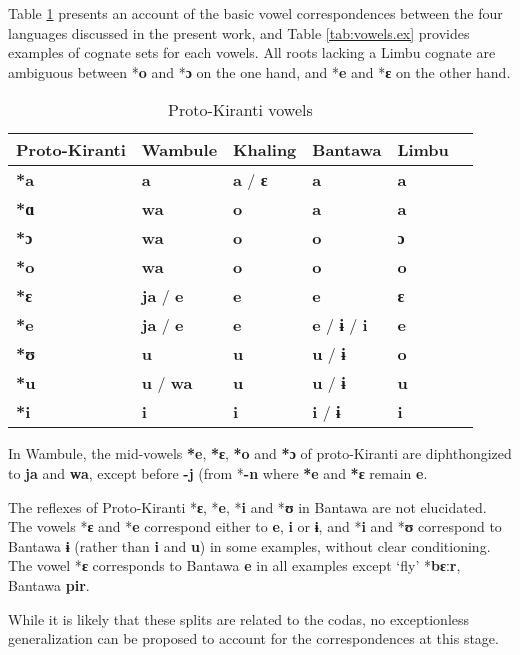 \documentclass[oneside,a4paper,11pt]{article}
\newcommand{\ipa}[1]{\textbf{{\phon\mbox{#1}}}} %
\begin{document}
Table \ref{tab:vowels} presents an account of the basic vowel correspondences between the four languages discussed in the present work, and Table \ref{tab:vowels.ex} provides examples of cognate sets for each vowels. All roots lacking a Limbu cognate are ambiguous between *\ipa{o} and *\ipa{ɔ} on the one hand, and *\ipa{e} and *\ipa{ɛ} on the other hand.



\begin{table}[H]
\caption{Proto-Kiranti vowels} \centering \label{tab:vowels}
\begin{tabular}{llllll}
\toprule
Proto-Kiranti & Wambule & Khaling & Bantawa & Limbu \\
\midrule
\ipa{*a} & \ipa{a} & \ipa{a}  / \ipa{ɛ} & \ipa{a} & \ipa{a}  \\
\ipa{*ɑ} & \ipa{wa} & \ipa{o} & \ipa{a} & \ipa{a}  \\
\ipa{*ɔ} & \ipa{wa} & \ipa{o} & \ipa{o} & \ipa{ɔ}  \\
\ipa{*o} & \ipa{wa} & \ipa{o} & \ipa{o} & \ipa{o}  \\
\ipa{*ɛ} & \ipa{ja} /  \ipa{e} & \ipa{e} & \ipa{e}  & \ipa{ɛ}  \\
\ipa{*e} & \ipa{ja} /  \ipa{e}  & \ipa{e} & \ipa{e}  / \ipa{ɨ} / \ipa{i} & \ipa{e}    \\
\ipa{*ʊ} & \ipa{u} & \ipa{u} & \ipa{u}  /  \ipa{ɨ}  & \ipa{o} \\
\ipa{*u} & \ipa{u} / \ipa{wa} & \ipa{u} & \ipa{u} /  \ipa{ɨ} \  & \ipa{u} \\
\ipa{*i} & \ipa{i} & \ipa{i} & \ipa{i}  / \ipa{ɨ} & \ipa{i}  \\
\bottomrule
\end{tabular}
\end{table}

In Wambule, the mid-vowels \ipa{*e}, \ipa{*ɛ}, \ipa{*o} and \ipa{*ɔ} of proto-Kiranti are diphthongized to \ipa{ja} and \ipa{wa}, except before \ipa{-j} (from *\ipa{-n} where \ipa{*e} and \ipa{*ɛ} remain \ipa{e}. 

The reflexes of Proto-Kiranti *\ipa{ɛ}, *\ipa{e}, *\ipa{i} and *\ipa{ʊ} in Bantawa are not elucidated. The vowels *\ipa{ɛ} and *\ipa{e} correspond either to \ipa{e}, \ipa{i} or \ipa{ɨ}, and *\ipa{i} and *\ipa{ʊ} correspond to Bantawa \ipa{ɨ} (rather than \ipa{i} and \ipa{u}) in some examples, without clear conditioning. The vowel *\ipa{ɛ} corresponds to Bantawa \ipa{e} in all examples except `fly' *\ipa{bɛːr}, Bantawa \ipa{pir}.

While it is likely that these splits are related to the codas, no exceptionless generalization can be proposed to account for the correspondences at this stage.
 
\end{document}
